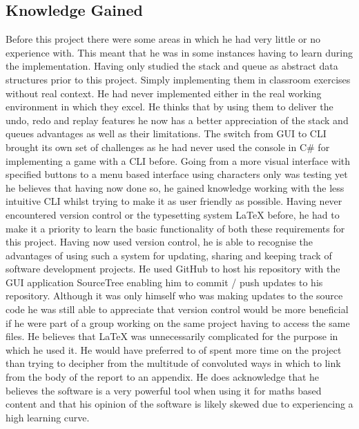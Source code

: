 \documentclass[10pt, a4paper]{article}
\begin{document}
 \subsection{Knowledge Gained}
 Before this project there were some areas in which he had very little or no experience with. This meant that he was in some instances having to learn during the implementation.
 \newline 
 Having only studied the stack and queue as abstract data structures prior to this project. Simply implementing them in classroom exercises without real context. He had never implemented either in the real working environment in which they excel. He thinks that by using them to deliver the undo, redo and replay features he now has a better appreciation of the stack and queues advantages as well as their limitations.
 \newline
 The switch from GUI to CLI brought its own set of challenges as he had never used the console in C\# for implementing a game with a CLI before. Going from a more visual interface with specified buttons to a menu based interface using characters only was testing yet he believes that having now done so, he gained knowledge working with the less intuitive CLI whilst trying to make it as user friendly as possible.
 \newline
 Having never encountered version control or the typesetting system LaTeX before, he had to make it a priority to learn the basic functionality of both these requirements for this project.
 \newline
 Having now used version control, he is able to recognise the advantages of using such a system for updating, sharing and keeping track of software development projects. He used GitHub to host his repository with the GUI application SourceTree enabling him to commit / push updates to his repository. Although it was only himself who was making updates to the source code he was still able to appreciate that version control would be more beneficial if he were part of a group working on the same project having to access the same files.
 \newline
 He believes that LaTeX was unnecessarily complicated for the purpose in which he used it. He would have preferred to of spent more time on the project than trying to decipher from the multitude of convoluted ways in which to link from the body of the report to an appendix. He does acknowledge that he believes the software is a very powerful tool when using it for maths based content and that his opinion of the software is likely skewed due to experiencing a high learning curve. 
 \newline
 
\end{document}
